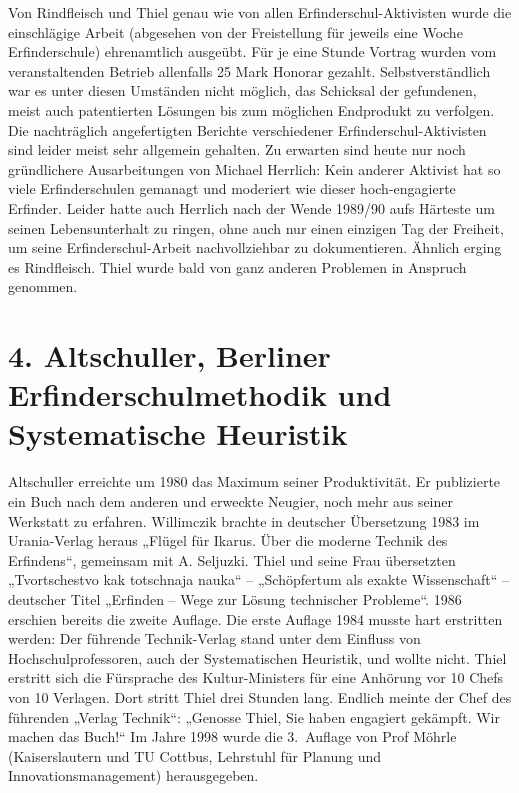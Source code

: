 \documentclass[11pt,a4paper]{article}
\begin{document}
Von Rindfleisch und Thiel genau wie von allen Erfinderschul-Aktivisten wurde
die einschlägige Arbeit (abgesehen von der Freistellung für jeweils eine Woche
Erfinderschule) ehrenamtlich ausgeübt. Für je eine Stunde Vortrag wurden vom
veranstaltenden Betrieb allenfalls 25 Mark Honorar gezahlt. Selbstverständlich
war es unter diesen Umständen nicht möglich, das Schicksal der gefundenen,
meist auch patentierten Lösungen bis zum möglichen Endprodukt zu verfolgen. Die
nachträglich angefertigten Berichte verschiedener Erfinderschul-Aktivisten sind
leider meist sehr allgemein gehalten. Zu erwarten sind heute nur noch
gründlichere Ausarbeitungen von Michael Herrlich: Kein anderer Aktivist hat so
viele Erfinderschulen gemanagt und moderiert wie dieser hoch-engagierte
Erfinder.  Leider hatte auch Herrlich nach der Wende 1989/90 aufs Härteste
um seinen Lebensunterhalt zu ringen, ohne auch nur einen einzigen Tag der
Freiheit, um seine Erfinderschul-Arbeit nachvollziehbar zu dokumentieren.
Ähnlich erging es Rindfleisch. Thiel wurde bald von ganz anderen Problemen in
Anspruch genommen.

\section*{4. Altschuller, Berliner Erfinderschulmethodik und\\ Systematische
  Heuristik} 

Altschuller erreichte um 1980 das Maximum seiner Produktivität. Er publizierte
ein Buch nach dem anderen und erweckte Neugier, noch mehr aus seiner Werkstatt
zu erfahren. Willimczik brachte in deutscher Übersetzung 1983 im Urania-Verlag
heraus „Flügel für Ikarus. Über die moderne Technik des Erfindens“, gemeinsam
mit A. Seljuzki. Thiel und seine Frau übersetzten „Tvortschestvo kak totschnaja
nauka“ – „Schöpfertum als exakte Wissenschaft“ – deutscher Titel „Erfinden –
Wege zur Lösung technischer Probleme“. 1986 erschien bereits die zweite
Auflage.  Die erste Auflage 1984 musste hart erstritten werden: Der führende
Technik-Verlag stand unter dem Einfluss von Hochschulprofessoren, auch der
Systematischen Heuristik, und wollte nicht. Thiel erstritt sich die Fürsprache
des Kultur-Ministers für eine Anhörung vor 10 Chefs von 10 Verlagen. Dort
stritt Thiel drei Stunden lang. Endlich meinte der Chef des führenden „Verlag
Technik“: „Genosse Thiel, Sie haben engagiert gekämpft. Wir machen das Buch!“
Im Jahre 1998 wurde die 3.~Auflage von Prof Möhrle (Kaiserslautern und TU
Cottbus, Lehrstuhl für Planung und Innovationsmanagement) herausgegeben.
\end{document}
